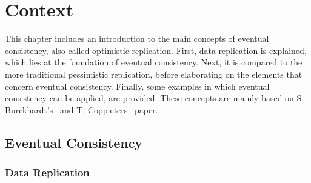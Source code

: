 \documentclass[a4paper,12pt]{report}
\begin{document}
\chapter{Context}\label{cha:Context} %

This chapter includes an introduction to the main concepts of eventual consistency, also called optimistic replication. First, data replication is explained, which lies at the foundation of eventual consistency. Next, it is compared to the more traditional pessimistic replication, before elaborating on the elements that concern eventual consistency. Finally, some examples in which eventual consistency can be applied, are provided. These concepts are mainly based on S. Burckhardt's~\cite{Burckhardt} and T. Coppieters~\cite{Coppieters} paper.

\section{Eventual Consistency}\label{sec:EventualConsistency}

\subsection{Data Replication}
\end{document}
